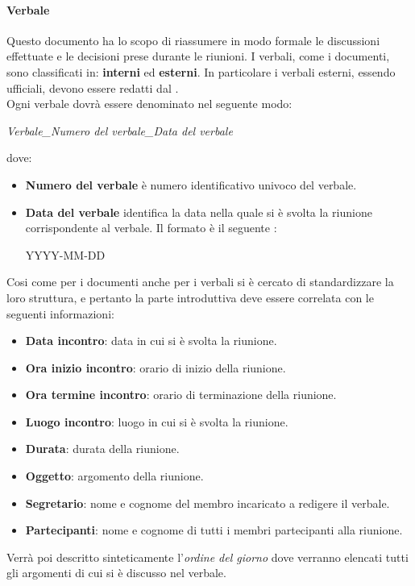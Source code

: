 \paragraph{Verbale}
Questo documento ha lo scopo di riassumere in modo formale le discussioni effettuate e le decisioni prese durante le riunioni. I verbali, come i documenti, sono classificati in:
\textbf{interni} ed \textbf{esterni}. In particolare i verbali esterni, essendo ufficiali, devono essere redatti dal \Pm. \\
Ogni verbale dovrà essere denominato nel seguente modo:
\begin{center}
  \textit{{Verbale}\_{Numero del verbale}\_{Data del verbale}}
\end{center}
dove:
\begin{itemize}
  \item \textbf{Numero del verbale} è numero identificativo univoco del verbale.
  \item \textbf{Data del verbale} identifica la data nella quale si è svolta la
  riunione corrispondente al verbale. Il formato è il seguente :
  \begin{center}
  YYYY-MM-DD
  \end{center}
\end{itemize}
Cosi come per i documenti anche per i verbali si è cercato di standardizzare la loro struttura, e pertanto la  parte introduttiva deve essere correlata con le seguenti informazioni:
\begin{itemize}
  \item \textbf{Data incontro}: data in cui si è svolta la riunione.
  \item \textbf{Ora inizio incontro}: orario di inizio della riunione.
  \item \textbf{Ora termine incontro}: orario di terminazione della riunione.
  \item \textbf{Luogo incontro}: luogo in cui si è svolta la riunione.
  \item \textbf{Durata}: durata della riunione.
  \item \textbf{Oggetto}: argomento della riunione.
  \item \textbf{Segretario}: nome e cognome del membro incaricato a redigere il
  verbale.
  \item \textbf{Partecipanti}: nome e cognome di tutti i membri partecipanti alla riunione.
  
\end{itemize}
Verrà poi descritto sinteticamente l'\textit{ordine del giorno} dove verranno elencati tutti gli argomenti di cui si è discusso nel verbale.
